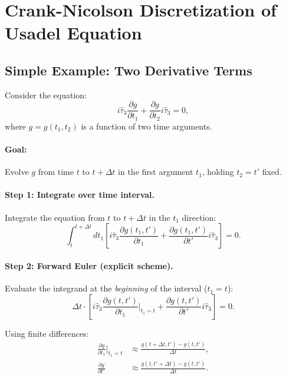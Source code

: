 \documentclass[11pt]{article}
\begin{document}
\section*{Crank-Nicolson Discretization of Usadel Equation}

\subsection*{Simple Example: Two Derivative Terms}

Consider the equation:
\begin{equation}
i\hat{\tau}_3 \frac{\partial g}{\partial t_1} + \frac{\partial g}{\partial t_2} i\hat{\tau}_3 = 0,
\end{equation}
where $g = g(t_1, t_2)$ is a function of two time arguments.

\paragraph{Goal:} Evolve $g$ from time $t$ to $t+\Delta t$ in the first argument $t_1$, holding $t_2 = t'$ fixed.

\paragraph{Step 1: Integrate over time interval.}

Integrate the equation from $t$ to $t+\Delta t$ in the $t_1$ direction:
\begin{equation}
\int_t^{t+\Delta t} dt_1 \left[i\hat{\tau}_3 \frac{\partial g(t_1, t')}{\partial t_1} + \frac{\partial g(t_1, t')}{\partial t'} i\hat{\tau}_3\right] = 0.
\end{equation}

\paragraph{Step 2: Forward Euler (explicit scheme).}

Evaluate the integrand at the \emph{beginning} of the interval ($t_1 = t$):
\begin{equation}
\Delta t \cdot \left[i\hat{\tau}_3 \frac{\partial g(t, t')}{\partial t_1}\bigg|_{t_1=t} + \frac{\partial g(t, t')}{\partial t'} i\hat{\tau}_3\right] = 0.
\end{equation}

Using finite differences:
\begin{align}
\frac{\partial g}{\partial t_1}\bigg|_{t_1=t} &\approx \frac{g(t+\Delta t, t') - g(t, t')}{\Delta t}, \\
\frac{\partial g}{\partial t'} &\approx \frac{g(t, t'+\Delta t) - g(t, t')}{\Delta t}.
\end{align}
\end{document}
